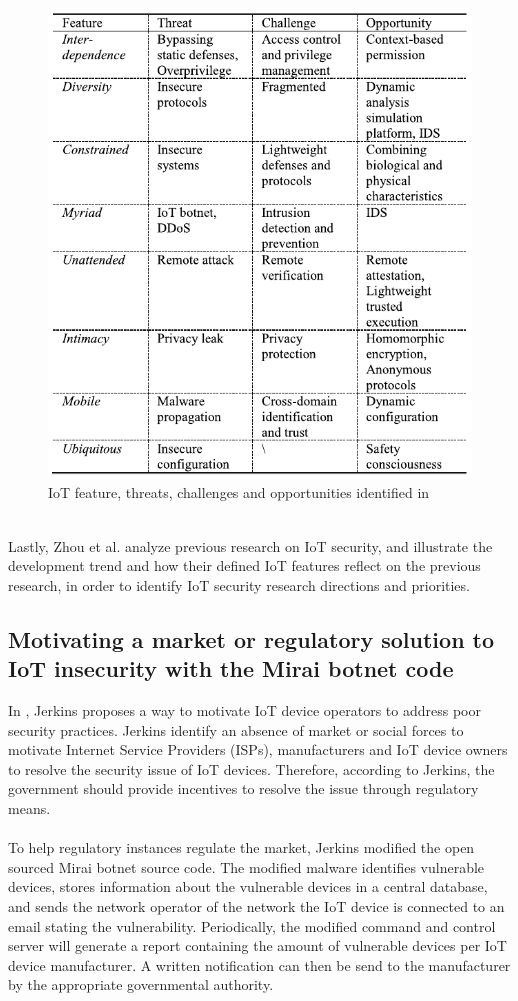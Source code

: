 \documentclass[a4paper,10pt]{article}
\begin{document}
\begin{figure}[hbtp]
 \centering
 \includegraphics[width=0.45\linewidth]{zhou.png}
 \caption{IoT feature, threats, challenges and opportunities identified in \cite{Zhou2019}}
 \label{fig:zhou_features}
\end{figure}
~\\
Lastly, Zhou et al. analyze previous research on IoT security, and illustrate the development trend and how their defined
IoT features reflect on the previous research, in order to identify IoT security research directions and priorities.

\subsection{Motivating a market or regulatory solution to {IoT} insecurity with the Mirai botnet code} \label{sec:literature_review:Jerkins2017}
In \cite{Jerkins2017}, Jerkins proposes a way to motivate IoT device operators to address poor security practices. Jerkins
identify an absence of market or social forces to motivate Internet Service Providers (ISPs), manufacturers and IoT
device owners to resolve the security issue of IoT devices. Therefore, according to Jerkins, the government should
provide incentives to resolve the issue through regulatory means. 
\\\\
To help regulatory instances regulate the market, Jerkins modified the open sourced Mirai botnet source code. The
modified malware identifies vulnerable devices, stores information about the vulnerable devices in a central database, 
and sends the network operator of the network the IoT device is connected to an email stating the vulnerability.  
Periodically, the modified command and control server will generate a report containing the amount of vulnerable 
devices per IoT device manufacturer. A written notification can then be send to the manufacturer by the appropriate 
governmental authority.
\end{document}
